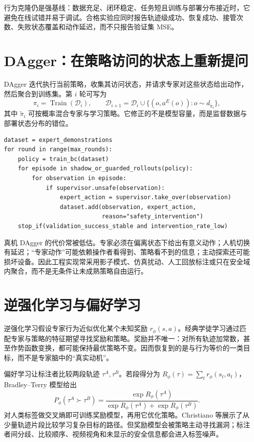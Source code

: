 行为克隆仍是强基线：数据充足、闭环稳定、任务短且训练与部署分布接近时，它避免在线试错并易于调试。合格实验应同时报告轨迹级成功、恢复成功、接管次数、失败状态覆盖和动作延迟，而不只报告验证集 MSE。

\section{DAgger：在策略访问的状态上重新提问}

DAgger 迭代执行当前策略，收集其访问状态，并请求专家对这些状态给出动作，然后聚合到训练集\cite{ross2011dagger}。第 $i$ 轮可写为
\begin{equation}
\pi_i=\operatorname{Train}(\mathcal D_i),\qquad
\mathcal D_{i+1}=\mathcal D_i\cup
\{(o,a^E(o)):o\sim d_{\tilde\pi_i}\},
\end{equation}
其中 $\tilde\pi_i$ 可按概率混合专家与学习策略。它修正的不是模型容量，而是监督数据与部署状态分布的错位。

\begin{lstlisting}[caption={带安全接管和聚合预算的 DAgger 教学伪代码}]
dataset = expert_demonstrations
for round in range(max_rounds):
    policy = train_bc(dataset)
    for episode in shadow_or_guarded_rollouts(policy):
        for observation in episode:
            if supervisor.unsafe(observation):
                expert_action = supervisor.take_over(observation)
                dataset.add(observation, expert_action,
                            reason="safety_intervention")
    stop_if(validation_success_stable and intervention_rate_low)
\end{lstlisting}

真机 DAgger 的代价常被低估。专家必须在偏离状态下给出有意义动作；人机切换有延迟；“专家动作”可能依赖操作者看得到、策略看不到的信息；主动探索还可能损坏设备。因此工程实现常采用影子模式、仿真扰动、人工回放标注或只在安全域内聚合，而不是无条件让未成熟策略自由运行。

\section{逆强化学习与偏好学习}

逆强化学习假设专家行为近似优化某个未知奖励 $r_\phi(s,a)$。经典学徒学习通过匹配专家与策略的特征期望寻找奖励和策略\cite{abbeel2004apprenticeship}。奖励并不唯一：对所有轨迹加常数，甚至作势函数变换，都可能保持最优策略不变。因而恢复到的是与行为等价的一类目标，而不是专家脑中的“真实动机”。

偏好学习让标注者比较两段轨迹 $\tau^A,\tau^B$。若段得分为 $R_\phi(\tau)=\sum_t r_\phi(s_t,a_t)$，Bradley--Terry 模型给出
\begin{equation}
P_\phi(\tau^A\succ\tau^B)
=\frac{\exp R_\phi(\tau^A)}{\exp R_\phi(\tau^A)+\exp R_\phi(\tau^B)}.
\label{eq:preference-probability}
\end{equation}
对人类标签做交叉熵即可训练奖励模型，再用它优化策略。Christiano 等展示了从少量轨迹片段比较学习复杂目标的路径\cite{christiano2017preferences}。但奖励模型会被策略主动寻找漏洞；标注者间分歧、比较顺序、视频视角和未显示的安全信息都会进入标签噪声。

